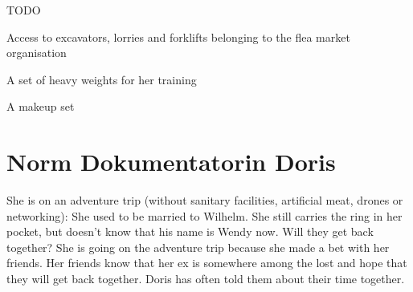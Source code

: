 \begin{npcBox}[title=Wendy]
    \begin{consequences}
    \item {}
    \item {}
    \item {}
    \end{consequences}

    \begin{npcDescription}
    TODO
    \end{npcDescription}


    \begin{equipment}
    \item Access to excavators, lorries and forklifts belonging to the flea market organisation
    \item A set of heavy weights for her training
    \item A makeup set
    \end{equipment}
\end{npcBox}
\newpage

\section{Norm Dokumentatorin Doris}

She is on an adventure trip (without sanitary facilities, artificial meat, drones or networking): She used to be married to Wilhelm. She still carries the ring in her pocket, but doesn't know that his name is Wendy now. Will they get back together?
She is going on the adventure trip because she made a bet with her friends. Her friends know that her ex is somewhere among the lost and hope that they will get back together. Doris has often told them about their time together.

